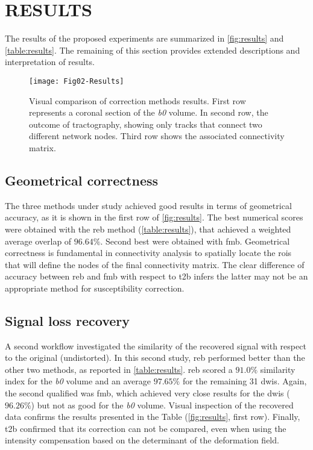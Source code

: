 \section{RESULTS}
\label{sec:results}
The results of the proposed experiments are summarized
in \autoref{fig:results} and \autoref{table:results}.
The remaining of this section provides extended descriptions
and interpretation of results.



\begin{figure*}[tpb]
   \centering
   \texttt{[image: Fig02-Results]}
   \caption{Visual comparison of correction methods results. 
   First row represents
   a coronal section of the \textit{b0} volume. In second row, the outcome
   of tractography, showing only tracks that connect two different
   network nodes. Third row shows the associated connectivity matrix. }
   \label{fig:results}
\end{figure*}


\subsection{Geometrical correctness}

The three methods under study achieved good results in
terms of geometrical accuracy, as it is shown in the first
row of \autoref{fig:results}. The best numerical scores
were obtained with the \gls*{reb} method (\autoref{table:results}),
that achieved a weighted average overlap of $96.64\%$. Second
best were obtained with \gls*{fmb}. Geometrical correctness
is fundamental in connectivity analysis to spatially locate the
\glspl*{roi} that will define the nodes of the final connectivity
matrix. The clear difference of accuracy between \gls*{reb} and \gls*{fmb}
with respect to \gls*{t2b} infers the latter may not be
an appropriate method for susceptibility correction.

\subsection{Signal loss recovery}

A second workflow investigated the similarity of the recovered
signal with respect to the original (undistorted).
In this second study, \gls*{reb} performed
better than the other two methods, as reported
in \autoref{table:results}. \gls*{reb} scored a $91.0\%$
similarity index for the \textit{b0} volume and an average $97.65\%$
for the remaining 31 \glspl*{dwi}. Again, the second
qualified was \gls*{fmb}, which achieved very close results
for the \glspl*{dwi} ($96.26\%$) but not as good for the \textit{b0}
volume. Visual inspection of the recovered data confirms the 
results presented in the Table (\autoref{fig:results}, first
row). Finally, \gls*{t2b} confirmed that its correction
can not be compared, even when using the intensity compensation
based on the determinant of the deformation field.

